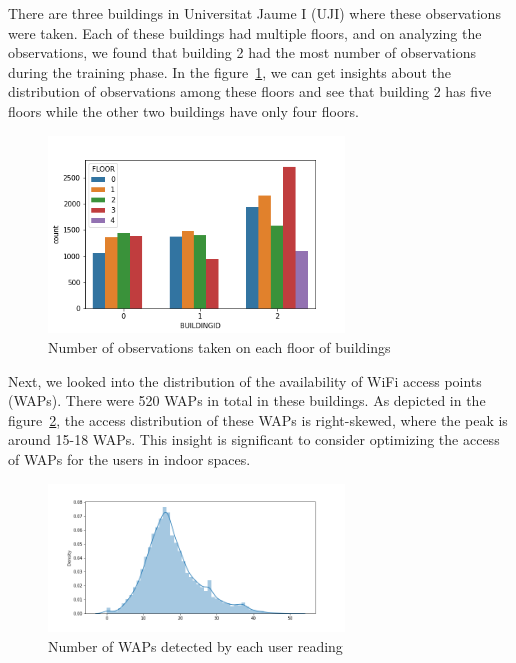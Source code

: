 \documentclass[a4paper,singleside,12pt]{report} %
\begin{document}
			There are three buildings in Universitat Jaume I (UJI) where these observations were taken. 
			Each of these buildings had multiple floors, and on analyzing the observations, we found that building 2 had the most number of observations during the training phase. 
			In the figure~\ref{fig4.4}, we can get insights about the distribution of observations among these floors and see that building 2 has five floors while the other two buildings have only four floors.
	
			\begin{figure}[h!]
			\centerline{\includegraphics[width=0.7\textwidth]{./figures/floor_by_building_count_plot_training.png}}
			\caption{Number of observations taken on each floor of buildings}
			\label{fig4.4}
			\end{figure}
	
			Next, we looked into the distribution of the availability of WiFi access points (WAPs). 
			There were 520 WAPs in total in these buildings.  
			As depicted in the figure~\ref{fig4.5}, the access distribution of these WAPs is right-skewed, where the peak is around 15-18 WAPs. 
			This insight is significant to consider optimizing the access of WAPs for the users in indoor spaces.
	
			\begin{figure}[h!]
			\centerline{\includegraphics[width=0.7\textwidth]{./figures/wap_dist_plot.png}}
			\caption{Number of WAPs detected by each user reading}
			\label{fig4.5}
			\end{figure}
	
\end{document}
